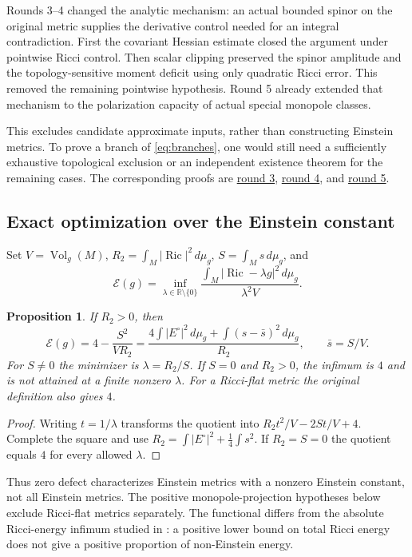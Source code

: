 \documentclass[11pt,a4paper]{article}
\newtheorem{proposition}[theorem]{Proposition}
\theoremstyle{definition}
\theoremstyle{remark}
\DeclareMathOperator{\Ric}{Ric}
\DeclareMathOperator{\Vol}{Vol}
\newcommand{\R}{\mathbb R}
\newcommand{\cE}{\mathcal E}
\newcommand{\dd}{\,d\mu_g}
\newcommand{\roundref}[2]{\href{run:../references/rounds/#1}{#2}}
\numberwithin{equation}{section}
\begin{document}
Rounds 3--4 changed the analytic mechanism: an actual bounded
spinor on the original metric supplies the derivative control needed for
an integral contradiction. First the covariant Hessian estimate closed
the argument under pointwise Ricci control. Then scalar clipping
preserved the spinor amplitude and the topology-sensitive moment deficit
using only quadratic Ricci error. This removed the remaining pointwise
hypothesis. Round 5 already extended that mechanism to
the polarization capacity of actual special monopole classes.

This excludes candidate approximate inputs, rather than constructing
Einstein metrics. To prove a branch of \eqref{eq:branches}, one would
still need a sufficiently exhaustive topological exclusion or an
independent existence theorem for the remaining cases. The corresponding
proofs are \roundref{round3_rigidity.md}{round 3},
\roundref{round4_rigidity.md}{round 4}, and
\roundref{round5_rigidity.md}{round 5}.

\subsection{Exact optimization over the Einstein constant}\label{sub:energy-optimization}
Set $V=\Vol_g(M)$, $R_2=\int_M|\Ric|^2\dd$, $S=\int_Ms\dd$, and
\begin{equation}\label{eq:energy-definition}
 \cE(g)=\inf_{\lambda\in\R\setminus\{0\}}
       \frac{\int_M|\Ric-\lambda g|^2\dd}{\lambda^2V}.
\end{equation}
\begin{proposition}\label{prop:optimization}
If $R_2>0$, then
\begin{equation}\label{eq:energy-fraction}
 \cE(g)=4-\frac{S^2}{VR_2}
 =\frac{4\int|E^\circ|^2\dd+\int(s-\bar s)^2\dd}{R_2},
 \qquad \bar s=S/V.
\end{equation}
For $S\ne0$ the minimizer is $\lambda=R_2/S$. If $S=0$ and $R_2>0$,
the infimum is $4$ and is not attained at a finite nonzero $\lambda$.
For a Ricci-flat metric the original definition also gives $4$.
\end{proposition}
\begin{proof}
Writing $t=1/\lambda$ transforms the quotient into
$R_2t^2/V-2St/V+4$. Complete the square and use
$R_2=\int|E^\circ|^2+\frac14\int s^2$.
If $R_2=S=0$ the quotient equals $4$ for every allowed $\lambda$.
\end{proof}
Thus zero defect characterizes Einstein metrics with a nonzero Einstein
constant, not all Einstein metrics. The positive monopole-projection
hypotheses below exclude Ricci-flat metrics separately. The functional
differs from the absolute Ricci-energy infimum studied in
\cite{LeBrun01}: a positive lower bound on total Ricci energy does not
give a positive proportion of non-Einstein energy.
\end{document}
